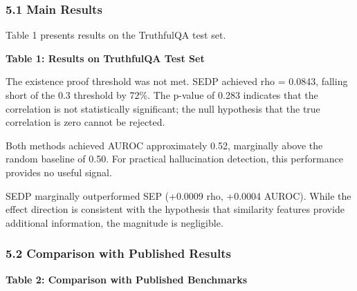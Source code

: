 
\subsubsection{5.1 Main Results}

Table 1 presents results on the TruthfulQA test set.

\textbf{Table 1: Results on TruthfulQA Test Set}

\begin{table}[htbp]
\centering
{}
\end{table}

The existence proof threshold was not met. SEDP achieved rho = 0.0843, falling short of the 0.3 threshold by 72\%. The p-value of 0.283 indicates that the correlation is not statistically significant; the null hypothesis that the true correlation is zero cannot be rejected.

Both methods achieved AUROC approximately 0.52, marginally above the random baseline of 0.50. For practical hallucination detection, this performance provides no useful signal.

SEDP marginally outperformed SEP (+0.0009 rho, +0.0004 AUROC). While the effect direction is consistent with the hypothesis that similarity features provide additional information, the magnitude is negligible.

\subsubsection{5.2 Comparison with Published Results}

\textbf{Table 2: Comparison with Published Benchmarks}

\begin{table}[htbp]
\centering
{}
\end{table}


